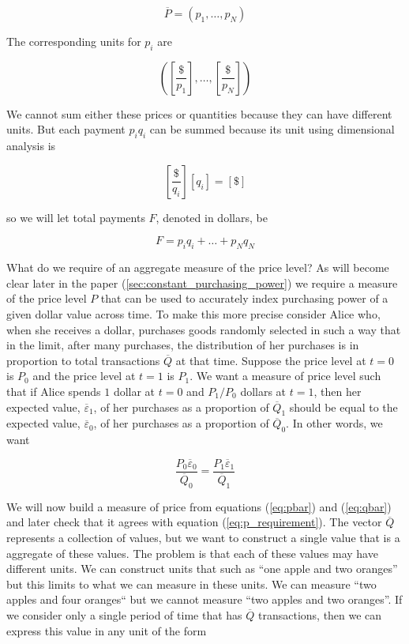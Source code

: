 \begin{equation} \label{eq:pbar}
    \overline P = \left( p_1, \dots, p_N \right)
\end{equation}

The corresponding units for $p_i$ are

\[ \left( \left[ \frac {\$} {p_1} \right], \dots, \left[ \frac {\$} {p_N} \right] \right) \]

We cannot sum either these prices or quantities because they can have different units. But each
payment $p_i q_i$ can be summed because its unit using dimensional analysis is

\[ \left[ \frac {\$} {q_i} \right] \left[ q_i \right] = \left[ \$ \right] \]

so we will let total payments $F$, denoted in dollars, be

\[ F = p_i q_i + \dots + p_N q_N \]

What do we require of an aggregate measure of the price level? As will become clear later in the
paper (\ref{sec:constant_purchasing_power}) we require a measure of the price level $P$ that can be
used to accurately index purchasing power of a given dollar value across time. To make this more
precise consider Alice who, when she receives a dollar, purchases goods randomly selected in such a
way that in the limit, after many purchases, the distribution of her purchases is in proportion to
total transactions $\overline Q$ at that time. Suppose the price level at $t=0$ is $P_0$ and the
price level at $t=1$ is $P_1$. We want a measure of price level such that if Alice spends $1$ dollar
at $t=0$ and $P_1 / P_0$ dollars at $t=1$, then her expected value, $\overline \varepsilon_1$, of her purchases as
a proportion of $\overline Q_1$ should be equal to the expected value, $\overline \varepsilon_0$, of her
purchases as a proportion of $\overline Q_0$. In other words, we want

\begin{equation} \label{eq:p_requirement}
    \frac {P_0 \overline \varepsilon_0} {\overline Q_0} = \frac {P_1 \overline \varepsilon_1} {\overline Q_1}
\end{equation}

We will now build a measure of price from equations (\ref{eq:pbar}) and (\ref{eq:qbar}) and later
check that it agrees with equation (\ref{eq:p_requirement}). The vector $\overline Q$ represents a
collection of values, but we want to construct a single value that is a aggregate of these values.
The problem is that each of these values may have different units. We can construct units that such
as ``one apple and two oranges'' but this limits to what we can measure in these units. We can
measure ``two apples and four oranges`` but we cannot measure ``two apples and two oranges''. If we
consider only a single period of time that has $\overline Q$ transactions, then we can express
this value in any unit of the form

